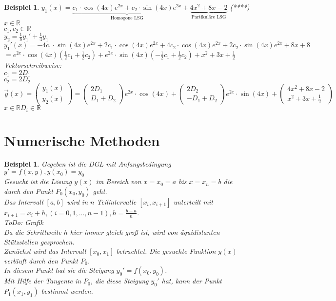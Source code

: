 \documentclass[fontset=ubuntu,12pt,a4paper]{scrreprt}
\newtheorem{beispiel}[defi]{Beispiel}
\begin{document}
\begin{beispiel}
         \( y_1(x)=\underbrace{c_1\cdot\cos(4x)e^{2x}+c_2\cdot\sin(4x)e^{2x}}_{\text{Homogone LSG}}+\underbrace{4x^2+8x-2}_{\text{Partikuläre LSG}}\)  (****) \\ \(x\in\mathbb{R}\) \\ \(c_1,c_2\in\mathbb{R}\) \\
         \(y_2=\frac{1}{8}y_1'+\frac{1}{4}y_1\)\\
         \(y_1'(x)=-4c_1\cdot\sin(4x)e^{2x}+2c_1\cdot\cos(4x)e^{2x}+4c_2\cdot\cos(4x)e^{2x}+2c_2\cdot\sin(4x)e^{2x}+8x+8 \) \\
         \(=e^{2x}\cdot\cos(4x)(
         \frac{1}{2}c_1+\frac{1}{2}c_2
         )+e^{2x}\cdot\sin(4x)(
         -\frac{1}{2}c_1+\frac{1}{2}c_2
         )+x^2+3x+\frac{1}{2} \) \\
         Vektorschreibweise: \\
         \(c_1=2D_1\) \\
         \(c_2=2D_2\) \\
         \( \vec{y}(x)=\begin{pmatrix}
         y_1(x) \\ y_2(x)
         \end{pmatrix}=\begin{pmatrix}2D_1 \\ D_1+D_2 \end{pmatrix} e^{2x}\cdot\cos(4x)+\begin{pmatrix}2D_2 \\ -D_1+D_2 \end{pmatrix}e^{2x}\cdot\sin(4x) + \begin{pmatrix}4x^2+8x-2 \\ x^2+3x +\frac{1}{2} \end{pmatrix} \)\\\(x\in\mathbb{R} D_i\in\mathbb{R}\)
         
         
     \end{beispiel}
 \section{Numerische Methoden}
 \begin{beispiel}
 	Gegeben ist die DGL mit Anfangsbedingung  \\
 	\(y'=f(x,y), y(x_0)=y_0\) \\
 	Gesucht ist die Lösung $y(x)$ im Bereich von $x=x_0=a$ bis $x=x_n=b$ die durch den Punkt $P_0(x_0,y_0)$ geht. \\
 	Das Intervall $\left[a,b\right]$ wird in $n$ Teilintervalle $\left[x_i,x_{i+1}\right]$ unterteilt mit $x_{i+1}=x_i+h, (i=0,1,...,n-1), h=\frac{b-a}{n}$.
 	\\ ToDo: Grafik \\
 	Da die Schrittweite $h$ hier immer gleich groß ist, wird von äquidistanten Stützstellen gesprochen. \\
 	Zunächst wird das Intervall $\left[x_0,x_1\right]$ betrachtet. Die gesuchte Funktion $y(x)$ verläuft durch den Punkt $P_0$. \\
 	In diesem Punkt hat sie die Steigung $y_0'=f(x_0,y_0)$.\\
 	Mit Hilfe der Tangente in $P_0$, die diese Steigung $y_0'$ hat, kann der Punkt $P_1(x_1,y_1)$ bestimmt werden.
 \end{beispiel}
\end{document}
